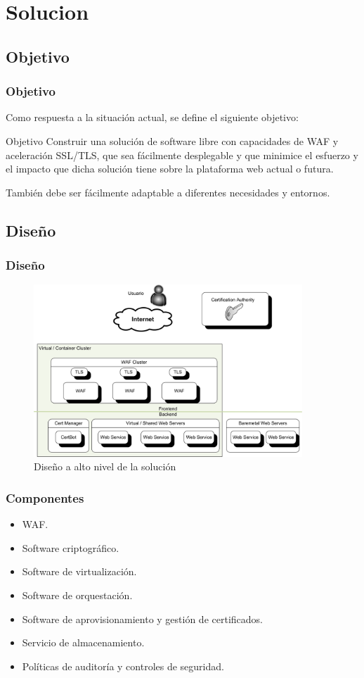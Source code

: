 \section{Solucion}
\subsection{Objetivo}
\begin{frame}[shrink]
  \frametitle{Objetivo}
  Como respuesta a la situación actual, se define el siguiente objetivo:
  \begin{block}{Objetivo}
    Construir una solución de software libre con capacidades de WAF y aceleración SSL/TLS, que sea  fácilmente desplegable y que minimice el esfuerzo y el impacto que dicha
    solución tiene sobre la plataforma web actual o futura.
    \par También debe ser fácilmente adaptable a diferentes necesidades y entornos.
  \end{block}
\end{frame}

\subsection{Diseño}
\begin{frame}[shrink]
  \frametitle{Diseño}
  \begin{figure}
    \includegraphics[width=0.9\textwidth]{fig/Diagram_HLD}
    \caption{\small{Diseño a alto nivel de la solución}}
  \end{figure}
\end{frame}

\begin{frame}[shrink]
  \frametitle{Componentes}
  \begin{itemize}
    \item WAF.
    \item Software criptográfico.
    \item Software de virtualización.
    \item Software de orquestación.
    \item Software de aprovisionamiento y gestión de certificados.
    \item Servicio de almacenamiento.
    \item Políticas de auditoría y controles de seguridad.
  \end{itemize}
\end{frame}

